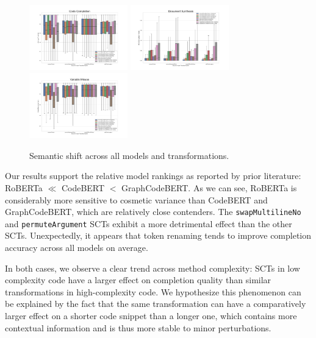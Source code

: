 \documentclass[usenames,dvipsnames]{article} %
\begin{document}
  \vspace{-10pt}\begin{figure}[H]
                  \centering\hspace*{-0.6cm}
                  \includegraphics[width=0.38\textwidth]{figs/Code Completion}\hspace*{-0.6cm}
                  \includegraphics[width=0.38\textwidth]{figs/Document Synthesis}\hspace*{-0.6cm}
                  \includegraphics[width=0.38\textwidth]{figs/Variable Misuse}
                  \caption{Semantic shift across all models and transformations.}
                  \label{fig:dataflow}
  \end{figure}

  Our results support the relative model rankings as reported by prior literature: RoBERTa $\ll$ CodeBERT $<$ GraphCodeBERT. As we can see, RoBERTa is considerably more sensitive to cosmetic variance than CodeBERT and GraphCodeBERT, which are relatively close contenders. The \lstinline|swapMultilineNo| and \lstinline|permuteArgument| SCTs exhibit a more detrimental effect than the other SCTs. Unexpectedly, it appears that token renaming tends to improve completion accuracy across all models on average.

  In both cases, we observe a clear trend across method complexity: SCTs in low complexity code have a larger effect on completion quality than similar transformations in high-complexity code. We hypothesize this phenomenon can be explained by the fact that the same transformation can have a comparatively larger effect on a shorter code snippet than a longer one, which contains more contextual information and is thus more stable to minor perturbations.
\end{document}
